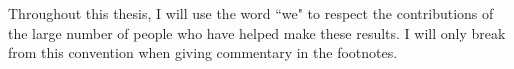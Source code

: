 
\begin{preface}

  Throughout this thesis, I will use the word ``we" to respect the contributions of the large
  number of people who have helped make these results. I will only break from this
  convention when giving commentary in the footnotes.

\end{preface}

